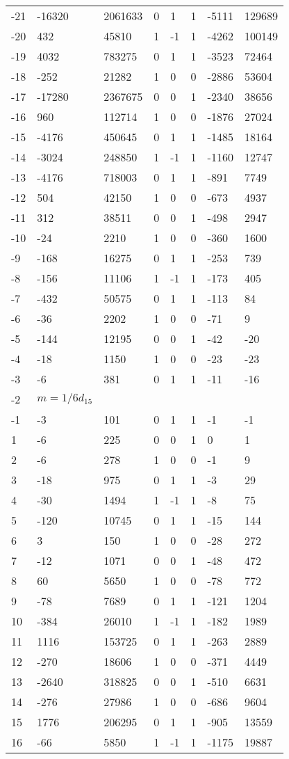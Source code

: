 \documentclass{amsart}
\begin{document}
\begin{longtable}{|l|l|l|lllll|}
-21&-16320&2061633&0&1&1&-5111&129689\\
-20&432&45810&1&-1&1&-4262&100149\\
-19&4032&783275&0&1&1&-3523&72464\\
-18&-252&21282&1&0&0&-2886&53604\\
-17&-17280&2367675&0&0&1&-2340&38656\\
-16&960&112714&1&0&0&-1876&27024\\
-15&-4176&450645&0&1&1&-1485&18164\\
-14&-3024&248850&1&-1&1&-1160&12747\\
-13&-4176&718003&0&1&1&-891&7749\\
-12&504&42150&1&0&0&-673&4937\\
-11&312&38511&0&0&1&-498&2947\\
-10&-24&2210&1&0&0&-360&1600\\
-9&-168&16275&0&1&1&-253&739\\
-8&-156&11106&1&-1&1&-173&405\\
-7&-432&50575&0&1&1&-113&84\\
-6&-36&2202&1&0&0&-71&9\\
-5&-144&12195&0&0&1&-42&-20\\
-4&-18&1150&1&0&0&-23&-23\\
-3&-6&381&0&1&1&-11&-16\\
-2&$m=1/6d_{15}$&&\multicolumn{5}{c|}{}\\
-1&-3&101&0&1&1&-1&-1\\
1&-6&225&0&0&1&0&1\\
2&-6&278&1&0&0&-1&9\\
3&-18&975&0&1&1&-3&29\\
4&-30&1494&1&-1&1&-8&75\\
5&-120&10745&0&1&1&-15&144\\
6&3&150&1&0&0&-28&272\\
7&-12&1071&0&0&1&-48&472\\
8&60&5650&1&0&0&-78&772\\
9&-78&7689&0&1&1&-121&1204\\
10&-384&26010&1&-1&1&-182&1989\\
11&1116&153725&0&1&1&-263&2889\\
12&-270&18606&1&0&0&-371&4449\\
13&-2640&318825&0&0&1&-510&6631\\
14&-276&27986&1&0&0&-686&9604\\
15&1776&206295&0&1&1&-905&13559\\
16&-66&5850&1&-1&1&-1175&19887\\

\end{longtable}
\end{document}

